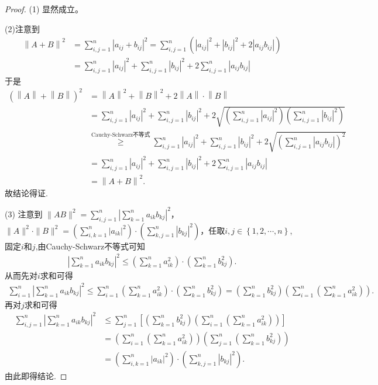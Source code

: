 \documentclass[../../main.tex]{subfiles}
\begin{document}
\begin{proof}
(1) 显然成立。

(2)注意到
\begin{align*}
\left\| A+B \right\| ^2&=\sum_{i,j=1}^n{\left| a_{ij}+b_{ij} \right|^2}=\sum_{i,j=1}^n{\left( \left| a_{ij} \right|^2+\left| b_{ij} \right|^2+2\left| a_{ij}b_{ij} \right| \right)}\\
&=\sum_{i,j=1}^n{\left| a_{ij} \right|^2}+\sum_{i,j=1}^n{\left| b_{ij} \right|^2}+2\sum_{i,j=1}^n{\left| a_{ij}b_{ij} \right|}
\end{align*}
于是
\begin{align*}
\left( \left\| A \right\| +\left\| B \right\| \right) ^2&=\left\| A \right\| ^2+\left\| B \right\| ^2+2\left\| A \right\| \cdot \left\| B \right\| \\
&=\sum_{i,j=1}^n{\left| a_{ij} \right|^2}+\sum_{i,j=1}^n{\left| b_{ij} \right|^2}+2\sqrt{\left( \sum_{i,j=1}^n{\left| a_{ij} \right|^2} \right) \left( \sum_{i,j=1}^n{\left| b_{ij} \right|^2} \right)}\\
&\overset{\text{Cauchy-Schwarz不等式}}{\geqslant}\sum_{i,j=1}^n{\left| a_{ij} \right|^2}+\sum_{i,j=1}^n{\left| b_{ij} \right|^2}+2\sqrt{\left( \sum_{i,j=1}^n{\left| a_{ij}b_{ij} \right|} \right) ^2}\\
&=\sum_{i,j=1}^n{\left| a_{ij} \right|^2}+\sum_{i,j=1}^n{\left| b_{ij} \right|^2}+2\sum_{i,j=1}^n{\left| a_{ij}b_{ij} \right|}\\
&=\left\| A+B \right\| ^2.
\end{align*}
故结论得证.

(3) 注意到 $\|AB\|^2 = \sum_{i,j = 1}^{n}\left|\sum_{k = 1}^{n}a_{ik}b_{kj}\right|^2$，$\|A\|^2\cdot\|B\|^2 = \left(\sum_{i,k = 1}^{n}|a_{ik}|^2\right)\cdot\left(\sum_{k,j = 1}^{n}|b_{kj}|^2\right)$，任取$i,j\in \left\{ 1,2,\cdots ,n \right\}$,固定$i$和$j$,由Cauchy-Schwarz不等式可知
\begin{align*}
\left| \sum_{k=1}^n{a_{ik}b_{kj}} \right|^2\leqslant \left( \sum_{k=1}^n{a_{ik}^{2}} \right) \cdot \left( \sum_{k=1}^n{b_{kj}^{2}} \right) .
\end{align*}
从而先对$i$求和可得
\begin{align*}
\sum_{i=1}^n{\left| \sum_{k=1}^n{a_{ik}b_{kj}} \right|^2}\leqslant \sum_{i=1}^n{\left( \sum_{k=1}^n{a_{ik}^{2}} \right) \cdot \left( \sum_{k=1}^n{b_{kj}^{2}} \right)}=\left( \sum_{k=1}^n{b_{kj}^{2}} \right) \left( \sum_{i=1}^n{\left( \sum_{k=1}^n{a_{ik}^{2}} \right)} \right) .
\end{align*}
再对$j$求和可得
\begin{align*}
\sum_{i,j=1}^n{\left| \sum_{k=1}^n{a_{ik}b_{kj}} \right|^2}&\leqslant \sum_{j=1}^n{\left[ \left( \sum_{k=1}^n{b_{kj}^{2}} \right) \left( \sum_{i=1}^n{\left( \sum_{k=1}^n{a_{ik}^{2}} \right)} \right) \right]}\\
&=\left( \sum_{i=1}^n{\left( \sum_{k=1}^n{a_{ik}^{2}} \right)} \right) \left( \sum_{j=1}^n{\left( \sum_{k=1}^n{b_{kj}^{2}} \right)} \right) \\
&=\left( \sum_{i,k=1}^n{|a_{ik}|^2} \right) \cdot \left( \sum_{k,j=1}^n{|b_{kj}|^2} \right) .
\end{align*}
由此即得结论.
\end{proof}
\end{document}
